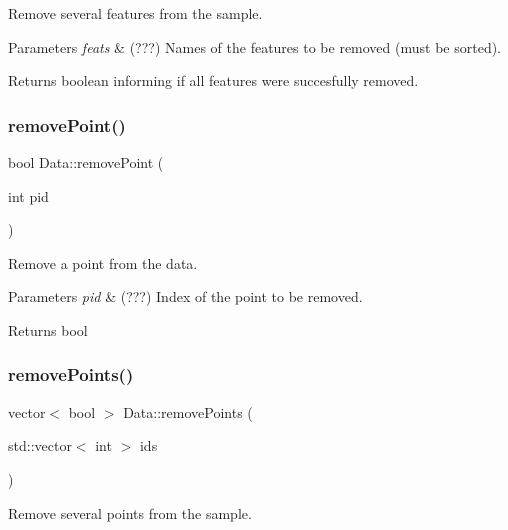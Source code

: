 Remove several features from the sample. 


\begin{DoxyParams}{Parameters}
{\em feats} & (???) Names of the features to be removed (must be sorted). \\
\hline
\end{DoxyParams}
\begin{DoxyReturn}{Returns}
boolean informing if all features were succesfully removed. 
\end{DoxyReturn}
\mbox{\label{class_data_ad927494a13a5018ff3644212d7234a03}} 
\subsubsection{\texorpdfstring{remove\+Point()}{removePoint()}}
{\footnotesize\ttfamily bool Data\+::remove\+Point (\begin{DoxyParamCaption}\item[{int}]{pid }\end{DoxyParamCaption})}



Remove a point from the data. 


\begin{DoxyParams}{Parameters}
{\em pid} & (???) Index of the point to be removed. \\
\hline
\end{DoxyParams}
\begin{DoxyReturn}{Returns}
bool 
\end{DoxyReturn}
\mbox{\label{class_data_a6cc376e614e5440061c66833e1c8d30a}} 
\subsubsection{\texorpdfstring{remove\+Points()}{removePoints()}}
{\footnotesize\ttfamily vector$<$ bool $>$ Data\+::remove\+Points (\begin{DoxyParamCaption}\item[{std\+::vector$<$ int $>$}]{ids }\end{DoxyParamCaption})}



Remove several points from the sample. 


